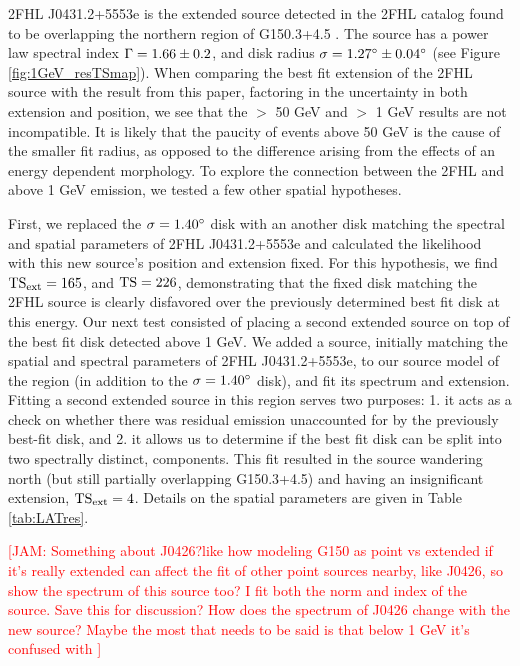 \documentclass[iop]{emulateapj}
\newcommand{\kibitz}[2]{\ifnum\Comments=1\textcolor{#1}{#2}\fi}
\newcommand{\jamie}[1]{\kibitz{red}      {[JAM: #1]}}
\newcommand{\Gone}{G150.3+4.5}
\newcommand{\ghard}{2FHL J0431.2+5553e}
\begin{document}
\ghard{} is the extended source detected in the 2FHL catalog found to be overlapping the northern region of \Gone{} \cite{2FHL}. The source has a power law spectral index ${\rm \Gamma = 1.66 \pm 0.2}$, and disk radius ${\rm \sigma = 1.27^\circ \pm 0.04^\circ}$ (see Figure \ref{fig:1GeV_resTSmap}). When comparing the best fit extension of the 2FHL source with the result from this paper, factoring in the uncertainty in both extension and position, we see that the $>$ 50 GeV and $>$ 1 GeV results are not incompatible. It is likely that the paucity of events above 50 GeV is the cause of the smaller fit radius, as opposed to the difference arising from the effects of an energy dependent morphology. To explore the connection between the 2FHL and above 1 GeV emission, we tested a few other spatial hypotheses.

First, we  replaced the ${\rm \sigma = 1.40^{\circ}}$ disk with an another disk matching the spectral and spatial parameters of \ghard{} and calculated the likelihood with this new source's position and extension fixed. For this hypothesis, we find ${\rm TS_{ext} =  165}$, and  ${\rm TS = 226}$, demonstrating that the fixed disk matching the 2FHL source is clearly disfavored over the previously determined best fit disk at this energy. Our next test consisted of placing a second extended source on top of the best fit disk detected above 1 GeV. We added a source, initially matching the spatial and spectral parameters of \ghard{}, to our source model of the region (in addition to the ${\rm \sigma = 1.40^{\circ}}$ disk), and fit its spectrum and extension. Fitting a second extended source in this region serves two purposes: 1. it acts as a check on whether there was residual emission unaccounted for by the previously best-fit disk, and 2. it allows us to determine if the best fit disk can be split into two spectrally distinct, components. This fit resulted in the source wandering north (but still partially overlapping \Gone{}) and having an insignificant extension, ${\rm TS_{ext} =  4}$. Details on the spatial parameters are given in Table \ref{tab:LATres}.


\jamie{Something about J0426?like  how modeling G150 as point vs extended if it's really extended can affect the fit of other point sources nearby, like J0426, so show the spectrum of this source too?  I fit both the norm and index of the source. Save this for discussion? How does the spectrum of J0426 change with the new source? Maybe the most that needs to be said is that below 1 GeV it's confused with }
\end{document}
